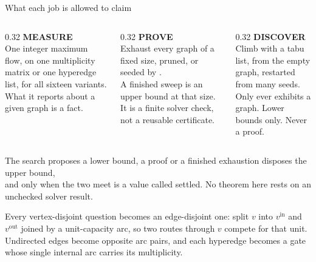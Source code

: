\documentclass[aspectratio=1610,11pt]{beamer}
\begin{document}
\begin{frame}{What each job is allowed to claim}
\vfill
\begin{columns}[T]
\begin{column}{0.32\textwidth}
  {\color{roleMeasure}\bfseries\large MEASURE}\\[8pt]
  {\small One integer maximum flow, on one multiplicity matrix or one hyperedge list, for all sixteen variants.}\\[8pt]
  {\scriptsize\color{black!55} What it reports about a given graph is a fact.}
\end{column}
\begin{column}{0.32\textwidth}
  {\color{roleProve}\bfseries\large PROVE}\\[8pt]
  {\small Exhaust every graph of a fixed size, pruned, or seeded by .}\\[8pt]
  {\scriptsize\color{black!55} A finished sweep is an upper bound at that size. It is a finite solver check, not a reusable certificate.}
\end{column}
\begin{column}{0.32\textwidth}
  {\color{roleDiscover}\bfseries\large DISCOVER}\\[8pt]
  {\small Climb with a tabu list, from the empty graph, restarted from many seeds.}\\[8pt]
  {\scriptsize\color{black!55} Only ever exhibits a graph. Lower bounds only. Never a proof.}
\end{column}
\end{columns}

\vspace{24pt}
\centering
{\color{black!55}\small The search proposes a lower bound, a proof or a finished exhaustion disposes the upper bound,}\\
{\color{black!55}\small and only when the two meet is a value called settled. No theorem here rests on an unchecked solver result.}
\vfill
\end{frame}

  {\figvertexsplit}
  {Every vertex-disjoint question becomes an edge-disjoint one: split $v$ into $v^{\mathrm{in}}$ and $v^{\mathrm{out}}$ joined by a unit-capacity arc, so two routes through $v$ compete for that unit. Undirected edges become opposite arc pairs, and each hyperedge becomes a gate whose single internal arc carries its multiplicity.}
\end{document}

